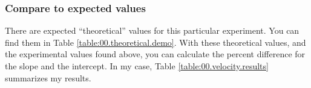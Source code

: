 \subsubsection{Compare to expected values}
%
There are expected ``theoretical'' values for this particular experiment. You can find them in Table \ref{table:00.theoretical.demo}. With these theoretical values, and the experimental values found above, you can calculate the percent difference for the slope and the intercept. In my case, Table \ref{table:00.velocity.results} summarizes my results.
%
\begin{center}
\end{center}
%
